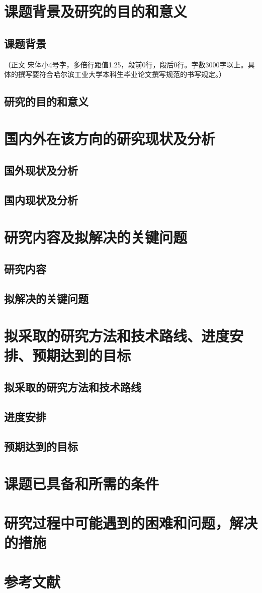 \section{课题背景及研究的目的和意义}
\subsection{课题背景}
（正文  宋体小4号字，多倍行距值1.25，段前0行，段后0行。字数3000字以上。具体的撰写要符合哈尔滨工业大学本科生毕业论文撰写规范的书写规定。）\cite{hithesis2017}
\subsection{研究的目的和意义}
\section{国内外在该方向的研究现状及分析}
\subsection{国外现状及分析}
\subsection{国内现状及分析}
\section{研究内容及拟解决的关键问题}
\subsection{研究内容}
\subsection{拟解决的关键问题}
\section{拟采取的研究方法和技术路线、进度安排、预期达到的目标}
\subsection{拟采取的研究方法和技术路线}
\subsection{进度安排}
\subsection{预期达到的目标}
\section{课题已具备和所需的条件}
\section{研究过程中可能遇到的困难和问题，解决的措施}
\section{参考文献}




